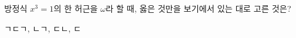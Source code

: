 방정식 $x^3=1$의 한 허근을 $\omega$라 할 때, 옳은 것만을 보기에서 있는 대로 고른 것은?  
\begin{choices32}{ㄱ}{ㄷ}{ㄱ, ㄴ}{ㄱ, ㄷ}{ㄴ, ㄷ}\end{choices32}
